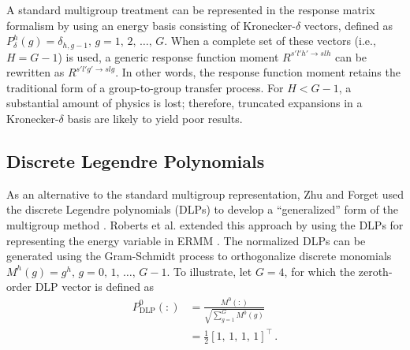 \documentclass[5p,times,twocolumn,10pt]{elsarticle}
\begin{document}
    A standard multigroup treatment can be represented in the response matrix
    formalism by using an energy basis consisting of Kronecker-$\delta$
    vectors, defined as $P_{\delta}^h(g) = \delta_{h, g-1},\, g=1,\, 2,\,
    \ldots,\, G$. When a complete set  of these vectors (i.e., $H = G-1$) is
    used, a generic response function moment $R^{s'l'h' \to slh}$ can be
    rewritten as $R^{s'l'g' \to slg}$. In other words, the response function
    moment retains the traditional form of a
    group-to-group transfer process.
    For $H < G-1$, a substantial amount of physics is lost; therefore,
    truncated expansions in a Kronecker-$\delta$ basis are likely to yield poor
    results.

    \subsection{Discrete Legendre Polynomials}

    As an alternative to the standard multigroup representation, Zhu and Forget
    used the discrete Legendre polynomials (DLPs) to develop a ``generalized''
    form of the multigroup method \cite{Zhu2011, Zhu2010}. Roberts et al.
    extended this approach by using the DLPs for representing the energy
    variable in ERMM \cite{roberts2014psb}. The normalized DLPs can be
    generated using the Gram-Schmidt process to orthogonalize discrete
    monomials $M^h(g) =  g^h,\, g=0,\,1,\,\ldots,\, G-1$. To illustrate, let
    $G=4$, for which the zeroth-order DLP vector is defined as
    \begin{equation}
        \begin{split}
            P_{\text{DLP}}^0(:) &= \frac{M^0(:)}{\sqrt{\sum_{g=1}^{G} M^0(g)}}
            \\
            &= \frac{1}{2}[1,\,1,\,1,\,1]^{\intercal} \, .
        \end{split}
    \end{equation}
\end{document}
